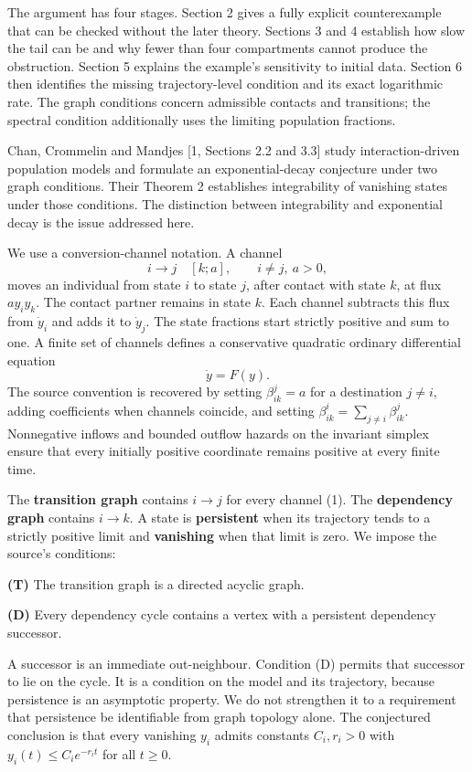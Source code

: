 \documentclass[
  11pt,
  a4paper,
]{scrartcl}
\begin{document}
The argument has four stages. Section 2 gives a fully explicit
counterexample that can be checked without the later theory. Sections 3
and 4 establish how slow the tail can be and why fewer than four
compartments cannot produce the obstruction. Section 5 explains the
example's sensitivity to initial data. Section 6 then identifies the
missing trajectory-level condition and its exact logarithmic rate. The
graph conditions concern admissible contacts and transitions; the
spectral condition additionally uses the limiting population fractions.

Chan, Crommelin and Mandjes {[}1, Sections 2.2 and 3.3{]} study
interaction-driven population models and formulate an exponential-decay
conjecture under two graph conditions. Their Theorem 2 establishes
integrability of vanishing states under those conditions. The
distinction between integrability and exponential decay is the issue
addressed here.

We use a conversion-channel notation. A channel \[
i\longrightarrow j\quad[k;a],\qquad i\ne j,\ a>0,
\tag{1}
\] moves an individual from state \(i\) to state \(j\), after contact
with state \(k\), at flux \(a y_i y_k\). The contact partner remains in
state \(k\). Each channel subtracts this flux from \(\dot y_i\) and adds
it to \(\dot y_j\). The state fractions start strictly positive and sum
to one. A finite set of channels defines a conservative quadratic
ordinary differential equation \[
\dot y=F(y).
\tag{2}
\] The source convention is recovered by setting \(\beta^j_{ik}=a\) for
a destination \(j\ne i\), adding coefficients when channels coincide,
and setting \(\beta^i_{ik}=\sum_{j\ne i}\beta^j_{ik}\). Nonnegative
inflows and bounded outflow hazards on the invariant simplex ensure that
every initially positive coordinate remains positive at every finite
time.

The \textbf{transition graph} contains \(i\to j\) for every channel (1).
The \textbf{dependency graph} contains \(i\to k\). A state is
\textbf{persistent} when its trajectory tends to a strictly positive
limit and \textbf{vanishing} when that limit is zero. We impose the
source's conditions:

\textbf{(T)} The transition graph is a directed acyclic graph.

\textbf{(D)} Every dependency cycle contains a vertex with a persistent
dependency successor.

A successor is an immediate out-neighbour. Condition (D) permits that
successor to lie on the cycle. It is a condition on the model and its
trajectory, because persistence is an asymptotic property. We do not
strengthen it to a requirement that persistence be identifiable from
graph topology alone. The conjectured conclusion is that every vanishing
\(y_i\) admits constants \(C_i,r_i>0\) with \(y_i(t)\le C_i e^{-r_i t}\)
for all \(t\ge0\).
\end{document}
